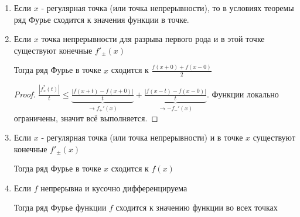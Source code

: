 \begin{consequence}
    \begin{enumerate}
        \item {
            Если $x$ - регулярная точка (или точка непрерывности), то в условиях теоремы ряд Фурье сходится к значения функции в точке.
        }
        \item {
            Если $x$ точка непрерывности для разрыва первого рода и в этой точке существуют конечные $f'_{\pm} (x)$

            Тогда ряд Фурье в точке $x$ сходится к $\frac{f(x + 0) + f(x - 0)}{2}$

            \begin{proof}
                $\frac{|f_x^* (t)|}{t} \leqslant \underbrace{\frac{|f(x + t) - f(x + 0)|}{t}}_{\rightarrow f_+'(x)} + \underbrace{\frac{|f(x - t) - f(x - 0)|}{t}}_{\rightarrow -f_-' (x)}$. Функции локально ограничены, значит всё выполняется.
            \end{proof}
        }
        \item {
            Если $x$ - регулярная точка (или точка непрерывности) и в точке $x$ существуют конечные $f'_{\pm} (x)$

            Тогда ряд Фурье в точке $x$ сходится к $f(x)$
        }
        \item {
            Если $f$ непрерывна и кусочно дифференцируема

            Тогда ряд Фурье функции $f$ сходится к значению функции во всех точках
        }
    \end{enumerate}
\end{consequence}

